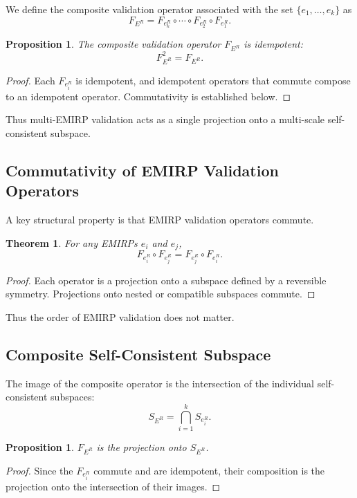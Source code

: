 \documentclass[11pt]{article}
\theoremstyle{definition}
\theoremstyle{plain}
\newtheorem{theorem}[definition]{Theorem}
\newtheorem{proposition}[definition]{Proposition}
\theoremstyle{remark}
\begin{document}
We define the composite validation operator associated with the set
$\{e_1,\dots,e_k\}$ as
\[
F_{E^R} = F_{e_k^R} \circ \cdots \circ F_{e_2^R} \circ F_{e_1^R}.
\]

\begin{proposition}
The composite validation operator $F_{E^R}$ is idempotent:
\[
F_{E^R}^2 = F_{E^R}.
\]
\end{proposition}

\begin{proof}
Each $F_{e_i^R}$ is idempotent, and idempotent operators that commute
compose to an idempotent operator. Commutativity is established below.
\end{proof}

Thus multi-EMIRP validation acts as a single projection onto a
multi-scale self-consistent subspace.

\subsection{Commutativity of EMIRP Validation Operators}

A key structural property is that EMIRP validation operators commute.

\begin{theorem}
For any EMIRPs $e_i$ and $e_j$,
\[
F_{e_i^R} \circ F_{e_j^R} = F_{e_j^R} \circ F_{e_i^R}.
\]
\end{theorem}

\begin{proof}
Each operator is a projection onto a subspace defined by a reversible
symmetry. Projections onto nested or compatible subspaces commute.
\end{proof}

Thus the order of EMIRP validation does not matter.

\subsection{Composite Self-Consistent Subspace}

The image of the composite operator is the intersection of the
individual self-consistent subspaces:
\[
S_{E^R} = \bigcap_{i=1}^k S_{e_i^R}.
\]

\begin{proposition}
$F_{E^R}$ is the projection onto $S_{E^R}$.
\end{proposition}

\begin{proof}
Since the $F_{e_i^R}$ commute and are idempotent, their composition is
the projection onto the intersection of their images.
\end{proof}
\end{document}
